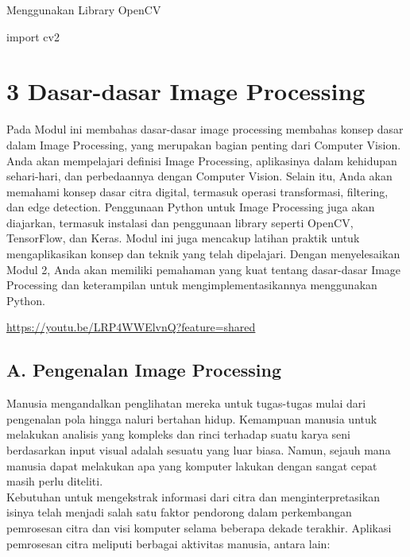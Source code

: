 \documentclass[
  letterpaper,
  DIV=11,
  numbers=noendperiod]{scrreprt}
\newenvironment{Shaded}{\begin{snugshade}}{\end{snugshade}}
\newcommand{\ImportTok}[1]{\textcolor[rgb]{0.00,0.46,0.62}{#1}}
\newcommand{\NormalTok}[1]{\textcolor[rgb]{0.00,0.23,0.31}{#1}}
\begin{document}
Menggunakan Library OpenCV

\begin{Shaded}
\begin{Highlighting}[]
\ImportTok{import}\NormalTok{ cv2}
\end{Highlighting}
\end{Shaded}

\hypertarget{dasar-dasar-image-processing}{%
\chapter*{3 Dasar-dasar Image
Processing}\label{dasar-dasar-image-processing}}


Pada Modul ini membahas dasar-dasar image processing membahas konsep
dasar dalam Image Processing, yang merupakan bagian penting dari
Computer Vision. Anda akan mempelajari definisi Image Processing,
aplikasinya dalam kehidupan sehari-hari, dan perbedaannya dengan
Computer Vision. Selain itu, Anda akan memahami konsep dasar citra
digital, termasuk operasi transformasi, filtering, dan edge detection.
Penggunaan Python untuk Image Processing juga akan diajarkan, termasuk
instalasi dan penggunaan library seperti OpenCV, TensorFlow, dan Keras.
Modul ini juga mencakup latihan praktik untuk mengaplikasikan konsep dan
teknik yang telah dipelajari. Dengan menyelesaikan Modul 2, Anda akan
memiliki pemahaman yang kuat tentang dasar-dasar Image Processing dan
keterampilan untuk mengimplementasikannya menggunakan Python.

\url{https://youtu.be/LRP4WWElvnQ?feature=shared}

\hypertarget{a.-pengenalan-image-processing}{%
\section*{A. Pengenalan Image
Processing}\label{a.-pengenalan-image-processing}}


Manusia mengandalkan penglihatan mereka untuk tugas-tugas mulai dari
pengenalan pola hingga naluri bertahan hidup. Kemampuan manusia untuk
melakukan analisis yang kompleks dan rinci terhadap suatu karya seni
berdasarkan input visual adalah sesuatu yang luar biasa. Namun, sejauh
mana manusia dapat melakukan apa yang komputer lakukan dengan sangat
cepat masih perlu diteliti.\\
Kebutuhan untuk mengekstrak informasi dari citra dan menginterpretasikan
isinya telah menjadi salah satu faktor pendorong dalam perkembangan
pemrosesan citra dan visi komputer selama beberapa dekade terakhir.
Aplikasi pemrosesan citra meliputi berbagai aktivitas manusia, antara
lain:
\end{document}
